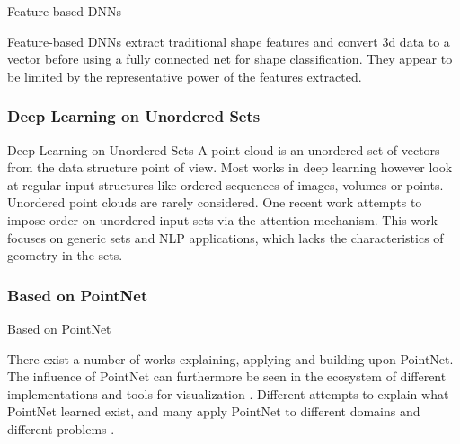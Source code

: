 \begin{frame}[c]{Feature-based DNNs}

Feature-based DNNs \cite{fang20153d, guo20153d} extract traditional shape
features and convert 3d data to a vector before using a fully connected net for
shape classification. They appear to be limited by the representative power of
the features extracted.

\end{frame}

\subsubsection{Deep Learning on Unordered Sets}

\begin{frame}[c]{Deep Learning on Unordered Sets}
A point cloud is an unordered set of vectors from the data structure point of
view. Most works in deep learning however look at regular input structures like
ordered sequences of images, volumes or points. Unordered point clouds are
rarely considered. One recent work \cite{vinyals2015order} attempts to impose
order on unordered input sets via the attention mechanism. This work focuses on
generic sets and NLP applications, which lacks the characteristics of geometry
in the sets.

\end{frame}


\subsubsection{Based on PointNet}

\begin{frame}[c]{Based on PointNet}

There exist a number of works explaining, applying and building upon PointNet.
The influence of PointNet can furthermore be seen in the ecosystem of different
implementations and tools for visualization \cite{charlesq342022Jun,
aldipiroli2022Jun, yunxiaoshi2022Jun, Pytorch_Pointnet_Pointnet2}. Different
attempts to explain what PointNet learned \cite{zhang2019explaining,
huang2019claim} exist, and many apply PointNet to different domains and
different problems \cite{thiery2022medical, gutierrez2018deep,
triess2021survey, liang2019multi, zhang2018collaborative, mrowca2018flexible}.
\end{frame}

